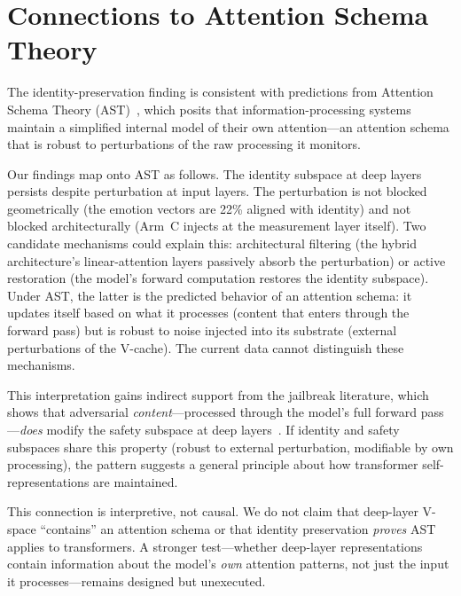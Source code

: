 \documentclass[11pt,a4paper]{article}
\begin{document}
\section{Connections to Attention Schema Theory}
\label{sec:ast}

The identity-preservation finding is consistent with predictions from
Attention Schema Theory
(AST)~\citep{graziano2015attention,graziano2017attention}, which posits that
information-processing systems maintain a simplified internal model of their
own attention---an attention schema that is robust to perturbations of the
raw processing it monitors.

Our findings map onto AST as follows. The identity subspace at deep layers
persists despite perturbation at input layers. The perturbation is not
blocked geometrically (the emotion vectors are 22\% aligned with identity)
and not blocked architecturally (Arm~C injects at the measurement layer
itself). Two candidate mechanisms could explain this:
architectural filtering (the hybrid architecture's linear-attention layers
passively absorb the perturbation) or active restoration (the model's
forward computation restores the identity subspace). Under AST, the latter
is the predicted behavior of an attention schema: it updates itself based
on what it processes (content that enters through the forward pass) but is
robust to noise injected into its substrate (external perturbations of the
V-cache). The current data cannot distinguish these mechanisms.

This interpretation gains indirect support from the jailbreak literature,
which shows that adversarial \emph{content}---processed through the model's
full forward pass---\emph{does} modify the safety subspace at deep
layers~\citep{arditi2024refusal}. If identity and safety subspaces share
this property (robust to external perturbation, modifiable by own
processing), the pattern suggests a general principle about how transformer
self-representations are maintained.

This connection is interpretive, not causal. We do not claim that deep-layer
V-space ``contains'' an attention schema or that identity preservation
\emph{proves} AST applies to transformers. A stronger test---whether
deep-layer representations contain information about the model's \emph{own}
attention patterns, not just the input it processes---remains designed but
unexecuted.

\end{document}

